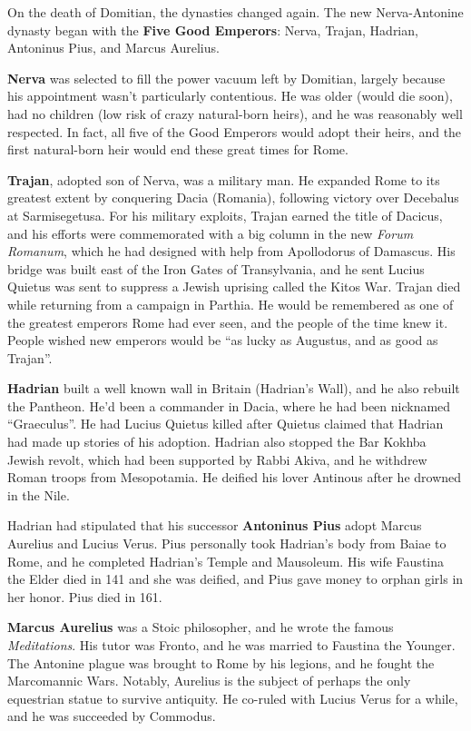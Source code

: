 On the death of Domitian, the dynasties changed again.
The new Nerva-Antonine dynasty began with the \textbf{Five Good Emperors}:
Nerva, Trajan, Hadrian, Antoninus Pius, and Marcus Aurelius.

\textbf{Nerva} was selected to fill the power vacuum left by Domitian,
largely because his appointment wasn't particularly contentious.
He was older (would die soon), had no children (low risk of crazy natural-born heirs),
and he was reasonably well respected.
In fact, all five of the Good Emperors would adopt their heirs,
and the first natural-born heir would end these great times for Rome.

\textbf{Trajan}, adopted son of Nerva, was a military man.
He expanded Rome to its greatest extent by conquering Dacia (Romania),
following victory over Decebalus at Sarmisegetusa.
For his military exploits, Trajan earned the title of Dacicus,
and his efforts were commemorated with a big column in the new \textit{Forum Romanum},
which he had designed with help from Apollodorus of Damascus.
His bridge was built east of the Iron Gates of Transylvania,
and he sent Lucius Quietus was sent to suppress a Jewish uprising called the Kitos War.
Trajan died while returning from a campaign in Parthia.
He would be remembered as one of the greatest emperors Rome had ever seen,
and the people of the time knew it.
People wished new emperors would be ``as lucky as Augustus, and as good as Trajan''.

\textbf{Hadrian} built a well known wall in Britain (Hadrian's Wall),
and he also rebuilt the Pantheon.
He'd been a commander in Dacia, where he had been nicknamed ``Graeculus''.
He had Lucius Quietus killed after Quietus claimed that Hadrian had made up stories of his adoption.
Hadrian also stopped the Bar Kokhba Jewish revolt, which had been supported by Rabbi Akiva,
and he withdrew Roman troops from Mesopotamia.
He deified his lover Antinous after he drowned in the Nile.

Hadrian had stipulated that his successor \textbf{Antoninus Pius}
adopt Marcus Aurelius and Lucius Verus.
Pius personally took Hadrian's body from Baiae to Rome,
and he completed Hadrian's Temple and Mausoleum.
His wife Faustina the Elder died in 141 and she was deified,
and Pius gave money to orphan girls in her honor.
Pius died in 161.

\textbf{Marcus Aurelius} was a Stoic philosopher, and he wrote the famous \textit{Meditations}.
His tutor was Fronto, and he was married to Faustina the Younger.
The Antonine plague was brought to Rome by his legions, and he fought the Marcomannic Wars.
Notably, Aurelius is the subject of perhaps the only equestrian statue to survive antiquity.
He co-ruled with Lucius Verus for a while, and he was succeeded by Commodus.

